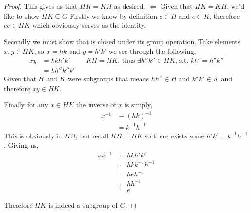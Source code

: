\documentclass[11pt]{article}
\begin{document}
\begin{proof}
     This gives us that $HK = KH$ as desired.
     \newpage
     $\Leftarrow$ Given that $HK = KH$, we'd like to show $HK \subseteq G$
     Firstly we know by definition $e\in H$ and $e \in K$, therefore $ee \in HK$ which obviously serves as the identity.
     
     Secondly we must show that is closed under its group operation. Take elements $x,y\in HK$, so $x = hk$ and $y = h'k'$ we see through the following,
     \begin{align*}
         xy &= hkh'k' && \text{$KH = HK$, thus $\exists h''k''\in HK$, s.t. $kh' = h''k''$} \\
         &= hh''k''k' 
     \end{align*}
     Given that $H$ and $K$ were subgroups that means $hh'' \in H$ and $k''k' \in K$ and therefore $xy\in HK$.

     Finally for any $x\in HK$ the inverse of $x$ is simply,
     \begin{align*}
         x^{-1} &= (hk)^{-1} \\
         &= k^{-1}h^{-1}
     \end{align*}
     This is obviously in $KH$, but recall $KH = HK$ so there exists some $h'k' = k^{-1}h^{-1}$. Giving us,
     \begin{align*}
         xx^{-1} &= hkh'k' \\
         &= hkk^{-1}h^{-1} \\
         &= heh^{-1} \\
         &= hh^{-1} \\
         &= e
     \end{align*}

     Therefore $HK$ is indeed a subgroup of $G$.
 \end{proof}

 
\end{document}
